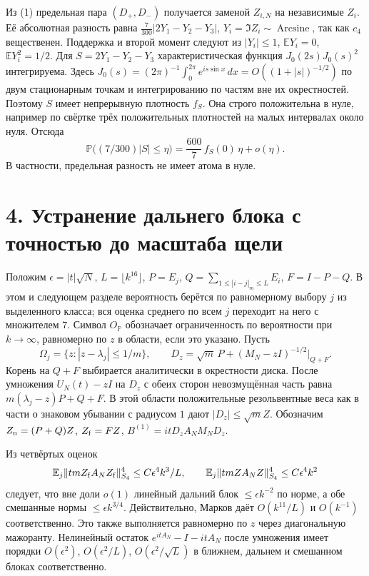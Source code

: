 \documentclass[11pt,a4paper]{article}
\newcommand{\EE}{\mathbb E}
\newcommand{\sect}[1]{\section*{\sffamily\color{ink}#1}}
\newcommand{\as}{\operatorname{Arcsine}}
\begin{document}
Из (1) предельная пара \((D_+,D_-)\) получается заменой \(Z_{i,N}\) на независимые \(Z_i\). Её абсолютная разность равна \(\tfrac7{300}|2Y_1-Y_2-Y_3|\), \(Y_i=\Im Z_i\sim\as\), так как \(c_4\) вещественен. Поддержка и второй момент следуют из \(|Y_i|\le1\), \(\mathbb EY_i=0\), \(\mathbb EY_i^2=1/2\). Для \(S=2Y_1-Y_2-Y_3\) характеристическая функция \(J_0(2s)J_0(s)^2\) интегрируема. Здесь \(J_0(s)=(2\pi)^{-1}\int_0^{2\pi} e^{is\sin x}\,dx=O((1+|s|)^{-1/2})\) по двум стационарным точкам и интегрированию по частям вне их окрестностей. Поэтому \(S\) имеет непрерывную плотность \(f_S\). Она строго положительна в нуле, например по свёртке трёх положительных плотностей на малых интервалах около нуля. Отсюда
\[
       \mathbb P\bigl((7/300)|S|\le \eta\bigr)
           = \frac{600}{7}\, f_S(0)\,\eta+o(\eta).
\]
В частности, предельная разность не имеет атома в нуле.
\newpage
\sect{4. Устранение дальнего блока с точностью до масштаба щели}
Положим \(\epsilon=|t|\sqrt N\), \(L=\lfloor k^{16}\rfloor\), \(P=E_j\), \(Q=\sum_{1\le |i-j|_m\le L}E_i\), \(F=I-P-Q\). В этом и следующем разделе вероятность берётся по равномерному выбору \(j\) из выделенного класса; вся оценка среднего по всем \(j\) переходит на него с множителем \(7\). Символ \(O_{\mathbb P}\) обозначает ограниченность по вероятности при \(k\to\infty\), равномерно по \(z\) в области, если это указано. Пусть
\[
   \Omega_j=\{z:|z-\lambda_j|\le1/m\},\qquad
   D_z=\sqrt m\,P+ (M_N-zI)^{-1/2}\big|_{Q+F}.
\]
Корень на \(Q+F\) выбирается аналитически в окрестности диска. После умножения \(U_N(t)-zI\) на \(D_z\) с обеих сторон невозмущённая часть равна \(m(\lambda_j-z)P+Q+F\). В этой области положительные резольвентные веса как в части о знаковом убывании с радиусом \(1\) дают \(|D_z|\le\sqrt m Z\). Обозначим \(Z_{\rm n}=(P+Q)Z\), \(Z_{\rm f}=FZ\), \(B^{(1)}=itD_z A_N M_N D_z\).

Из четвёртых оценок
\[
 \EE_j\|tm Z_{\rm f} A_N Z_{\rm f}\|_{S_4}^4
          \le C\epsilon^4 k^3/L,\qquad
 \EE_j\|tm Z A_N Z\|_{S_4}^4\le C\epsilon^4 k^2
\]
следует, что вне доли \(o(1)\) линейный дальний блок \(\le\epsilon k^{-2}\) по норме, а обе смешанные нормы \(\le\epsilon k^{3/4}\). Действительно, Марков даёт \(O(k^{11}/L)\) и \(O(k^{-1})\) соответственно. Это также выполняется равномерно по \(z\) через диагональную мажоранту. Нелинейный остаток \(e^{itA_N}-I-itA_N\) после умножения имеет порядки \(O(\epsilon^2)\), \(O(\epsilon^2/L)\), \(O(\epsilon^2/\sqrt L)\) в ближнем, дальнем и смешанном блоках соответственно.
\end{document}

